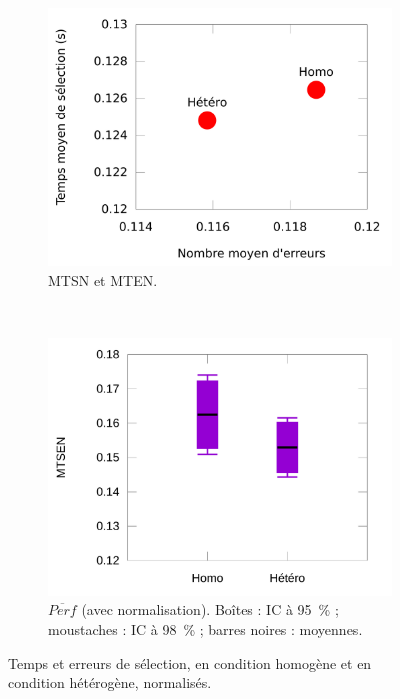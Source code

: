 \begin{figure}[!htb]
\begin{subfigure}[t]{0.49\textwidth}
			\includegraphics[width=\textwidth]{figures/ch5/normErrorsTimesScatter}
			\caption{MTSN et MTEN.}
			\label{fig:normErrorsTimesScatter}
		\end{subfigure}
		~
		\begin{subfigure}[t]{0.49\textwidth}
			\centering
			\includegraphics[width=\textwidth]{figures/ch5/normAsProducts}
			\caption{$\overline{Perf}$ (avec normalisation). Boîtes : IC à 95~\%{} ; \og moustaches \fg{} : IC à 98~\%{} ; barres noires : moyennes.}
			\label{fig:normAsProducts}
		\end{subfigure}
		\caption[Temps et erreurs de sélection, homogène vs. hétérogène -- II]{Temps et erreurs de sélection, en condition homogène et en condition hétérogène, normalisés.}
		\label{fig:normAsTimeAndErrors}
	\end{figure}


